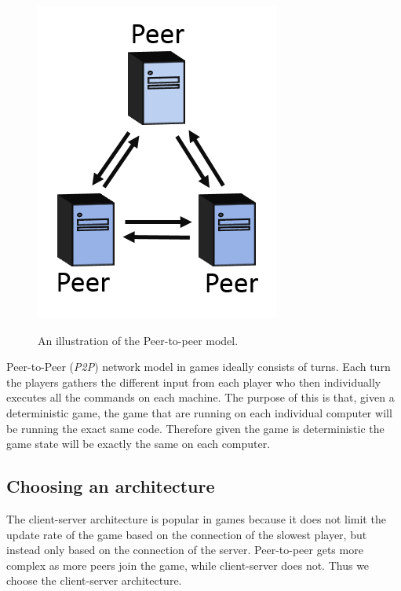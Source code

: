 \begin{figure}[H]
\centering
\includegraphics[scale=1]{figures/network/peer_peer}
\label{fig:peer_peer}
\caption{An illustration of the Peer-to-peer model.}
\end{figure}

Peer-to-Peer (\textit{P2P}) network model in games ideally consists of turns.
Each turn the players gathers the different input from each player who then individually executes all the commands on each machine.
The purpose of this is that, given a deterministic game, the game that are running on each individual computer will be running the exact same code. 
Therefore given the game is deterministic the game state will be exactly the same on each computer. 

\subsection{Choosing an architecture}
The client-server architecture is popular in games because it does not limit the update rate of the game based on the connection of the slowest player, but instead only based on the connection of the server.
Peer-to-peer gets more complex as more peers join the game, while client-server does not.
Thus we choose the client-server architecture.